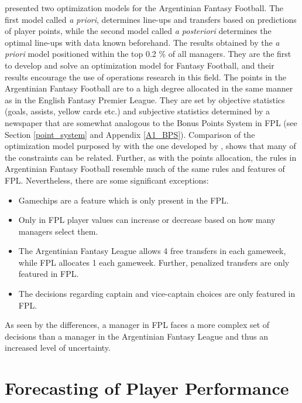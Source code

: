 \cite{Bonomo} presented two optimization models for the Argentinian Fantasy Football. The first model called \textit{a priori}, determines line-ups and transfers based on predictions of player points, while the second model called \textit{a posteriori} determines the optimal line-ups with data known beforehand. The results obtained by the \textit{a priori} model positioned within the top 0.2 \% of all managers. They are the first to develop and solve an optimization model for Fantasy Football, and their results encourage the use of operations research in this field. The points in the Argentinian Fantasy Football are to a high degree allocated in the same manner as in the English Fantasy Premier League. They are set by objective statistics (goals, assists, yellow cards etc.) and subjective statistics determined by a newspaper that are somewhat analogous to the Bonus Points System in FPL (see Section \ref{point_system} and Appendix \ref{A1_BPS}). Comparison of the optimization model purposed by \cite{Bonomo} with the one developed by \cite{Mathsports}, shows that many of the constraints can be related. Further, as with the points allocation, the rules in Argentinian Fantasy Football resemble much of the same rules and features of FPL. Nevertheless, there are some significant exceptions:


\begin{itemize}
    \item Gamechips are a feature which is only present in the FPL.  
    \item Only in FPL player values can increase or decrease based on how many managers select them.
    \item The Argentinian Fantasy League allows 4 free transfers in each gameweek, while FPL allocates 1 each gameweek. Further, penalized transfers are only featured in FPL.
    \item The decisions regarding captain and vice-captain choices are only featured in FPL.  
\end{itemize}

As seen by the differences, a manager in FPL faces a more complex set of decisions than a manager in the Argentinian Fantasy League and thus an increased level of uncertainty. 

\newpar



\section{Forecasting of Player Performance} \label{Forecasting_of_future_performance}

